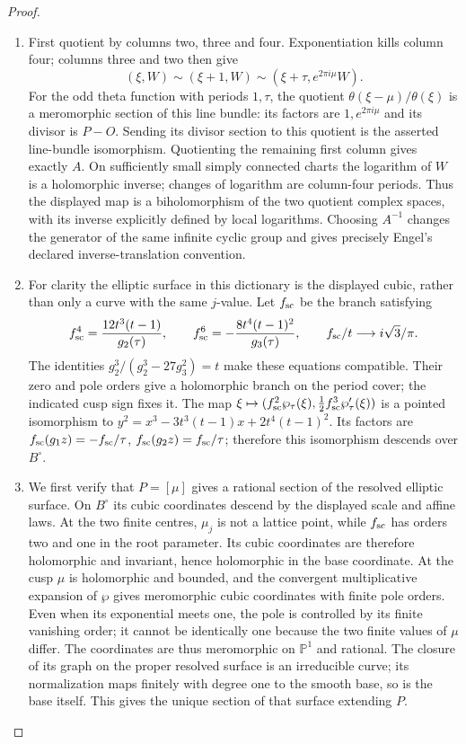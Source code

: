 \begin{proof}
\begin{enumerate}[label=\arabic*.,leftmargin=*]
\item First quotient by columns two, three and four. Exponentiation kills column four; columns three and two then give
\[
 (\xi,W)\sim(\xi+1,W)\sim(\xi+\tau,e^{2\pi i\mu}W).
\]
For the odd theta function with periods $1,\tau$, the quotient $\theta(\xi-\mu)/\theta(\xi)$ is a meromorphic section of this line bundle: its factors are $1,e^{2\pi i\mu}$ and its divisor is $P-O$. Sending its divisor section to this quotient is the asserted line-bundle isomorphism. Quotienting the remaining first column gives exactly $A$. On sufficiently small simply connected charts the logarithm of $W$ is a holomorphic inverse; changes of logarithm are column-four periods. Thus the displayed map is a biholomorphism of the two quotient complex spaces, with its inverse explicitly defined by local logarithms. Choosing $A^{-1}$ changes the generator of the same infinite cyclic group and gives precisely Engel's declared inverse-translation convention.

\item For clarity the elliptic surface in this dictionary is the displayed cubic, rather than only a curve with the same $j$-value. Let $f_{\rm sc}$ be the branch satisfying
\[
 f_{\rm sc}^4=\frac{12t^3(t-1)}{g_2(\tau)},\qquad
 f_{\rm sc}^6=-\frac{8t^4(t-1)^2}{g_3(\tau)},\qquad
 f_{\rm sc}/t\longrightarrow i\sqrt3/\pi.
\]
The identities $g_2^3/(g_2^3-27g_3^2)=t$ make these equations compatible. Their zero and pole orders give a holomorphic branch on the period cover; the indicated cusp sign fixes it. The map $\xi\mapsto(f_{\rm sc}^2\wp_\tau(\xi),\frac12f_{\rm sc}^3\wp'_\tau(\xi))$ is a pointed isomorphism to
$y^2=x^3-3t^3(t-1)x+2t^4(t-1)^2$. Its factors are $f_{\rm sc}(g_1z)=-f_{\rm sc}/\tau$, $f_{\rm sc}(g_2z)=f_{\rm sc}/\tau$; therefore this isomorphism descends over $B^\circ$.

\item We first verify that $P=[\mu]$ gives a rational section of the resolved elliptic surface. On $B^\circ$ its cubic coordinates descend by the displayed scale and affine laws. At the two finite centres, $\mu_j$ is not a lattice point, while $f_{\rm sc}$ has orders two and one in the root parameter. Its cubic coordinates are therefore holomorphic and invariant, hence holomorphic in the base coordinate. At the cusp $\mu$ is holomorphic and bounded, and the convergent multiplicative expansion of $\wp$ gives meromorphic cubic coordinates with finite pole orders. Even when its exponential meets one, the pole is controlled by its finite vanishing order; it cannot be identically one because the two finite values of $\mu$ differ. The coordinates are thus meromorphic on $\mathbb P^1$ and rational. The closure of its graph on the proper resolved surface is an irreducible curve; its normalization maps finitely with degree one to the smooth base, so is the base itself. This gives the unique section of that surface extending $P$.


\end{enumerate}
\end{proof}
